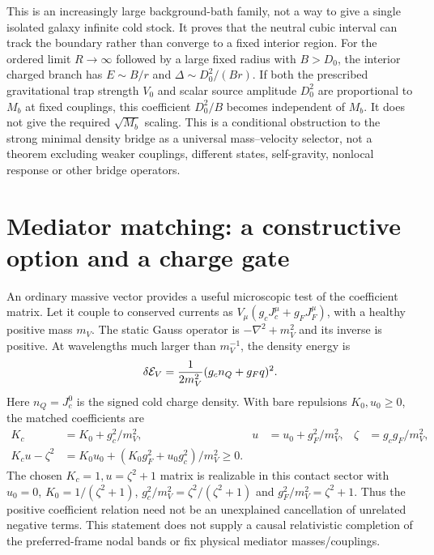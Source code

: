 \documentclass[11pt]{article}
\begin{document}
This is an increasingly large background-bath family, not a way to give a
single isolated galaxy infinite cold stock. It proves that the neutral
cubic interval can track the boundary rather than converge to a fixed
interior region. For the ordered limit $R\to\infty$ followed by a large
fixed radius with $B>D_0$, the interior charged branch has
$E\sim B/r$ and $\Delta\sim D_0^2/(Br)$.
If both the prescribed gravitational trap strength $V_0$ and scalar source
amplitude $D_0^2$ are proportional to $M_b$ at fixed couplings, this
coefficient $D_0^2/B$ becomes independent of $M_b$. It does not give the
required $\sqrt{M_b}$ scaling. This is a conditional obstruction to the
strong minimal density bridge as a universal mass--velocity selector,
not a theorem excluding weaker couplings, different states, self-gravity,
nonlocal response or other bridge operators.

\section{Mediator matching: a constructive option and a charge gate}
An ordinary massive vector provides a useful microscopic test of the
coefficient matrix. Let it couple to conserved currents as
$V_\mu(g_cJ_c^\mu+g_FJ_F^\mu)$, with a healthy positive mass $m_V$.
The static Gauss operator is $-\nabla^2+m_V^2$ and its inverse is
positive. At wavelengths much larger than $m_V^{-1}$, the density energy is
\begin{equation}
 \delta\mathcal E_V={1\over2m_V^2}(g_cn_Q+g_Fq)^2.
\end{equation}
Here $n_Q=J_c^0$ is the signed cold charge density. With bare repulsions
$K_0,u_0\geq0$, the matched coefficients are
\begin{align}
 K_c&=K_0+g_c^2/m_V^2,&
 u&=u_0+g_F^2/m_V^2,&
 \zeta&=g_cg_F/m_V^2,\\
 K_cu-\zeta^2&=K_0u_0+
              (K_0g_F^2+u_0g_c^2)/m_V^2\geq0.
\end{align}
The chosen $K_c=1,u=\zeta^2+1$ matrix is realizable in this contact
sector with $u_0=0$, $K_0=1/(\zeta^2+1)$,
$g_c^2/m_V^2=\zeta^2/(\zeta^2+1)$ and
$g_F^2/m_V^2=\zeta^2+1$. Thus the positive coefficient relation need
not be an unexplained cancellation of unrelated negative terms.
This statement does not supply a causal relativistic completion of the
preferred-frame nodal bands or fix physical mediator masses/couplings.
\end{document}
